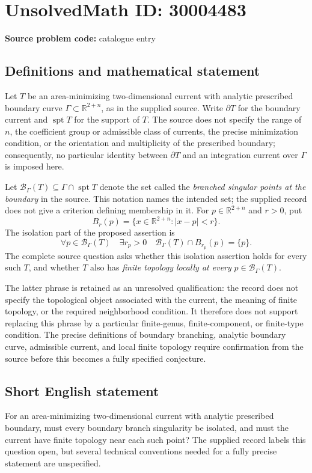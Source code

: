 \documentclass[11pt]{article}
\newcommand{\R}{\mathbb{R}}
\begin{document}
\section*{UnsolvedMath ID: 30004483}
\textbf{Source problem code:} catalogue entry
\subsection{Definitions and mathematical statement}
Let \(T\) be an area-minimizing two-dimensional current with analytic prescribed boundary curve \(\Gamma\subset\R^{2+n}\), as in the supplied source. Write \(\partial T\) for the boundary current and \(\operatorname{spt}T\) for the support of \(T\). The source does not specify the range of \(n\), the coefficient group or admissible class of currents, the precise minimization condition, or the orientation and multiplicity of the prescribed boundary; consequently, no particular identity between \(\partial T\) and an integration current over \(\Gamma\) is imposed here.

Let \(\mathcal B_{\Gamma}(T)\subseteq\Gamma\cap\operatorname{spt}T\) denote the set called the \emph{branched singular points at the boundary} in the source. This notation names the intended set; the supplied record does not give a criterion defining membership in it. For \(p\in\R^{2+n}\) and \(r>0\), put
\[
B_r(p)=\{x\in\R^{2+n}:|x-p|<r\}.
\]
The isolation part of the proposed assertion is
\[
\forall p\in\mathcal B_{\Gamma}(T)\quad
\exists r_p>0\quad
\mathcal B_{\Gamma}(T)\cap B_{r_p}(p)=\{p\}.
\]
The complete source question asks whether this isolation assertion holds for every such \(T\), and whether \(T\) also has \emph{finite topology locally at every} \(p\in\mathcal B_{\Gamma}(T)\).

The latter phrase is retained as an unresolved qualification: the record does not specify the topological object associated with the current, the meaning of finite topology, or the required neighborhood condition. It therefore does not support replacing this phrase by a particular finite-genus, finite-component, or finite-type condition. The precise definitions of boundary branching, analytic boundary curve, admissible current, and local finite topology require confirmation from the source before this becomes a fully specified conjecture.
\subsection{Short English statement}
For an area-minimizing two-dimensional current with analytic prescribed boundary, must every boundary branch singularity be isolated, and must the current have finite topology near each such point? The supplied record labels this question open, but several technical conventions needed for a fully precise statement are unspecified.
\end{document}
